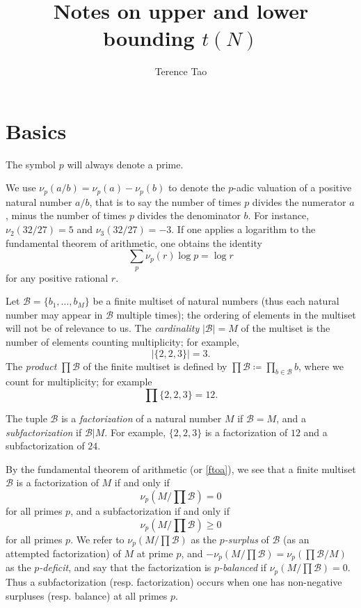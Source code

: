 \documentclass[12pt,a4paper,reqno]{amsart}
\numberwithin{equation}{section}
\theoremstyle{plain}
\theoremstyle{definition}
\newcommand\tuple{{\mathcal B}}
\begin{document}
\title{Notes on upper and lower bounding $t(N)$}

\author{Terence Tao}
\maketitle


\section{Basics}

The symbol $p$ will always denote a prime.

We use $\nu_p(a/b) = \nu_p(a)-\nu_p(b)$ to denote the $p$-adic valuation of a positive natural number $a/b$, that is to say the number of times $p$ divides the numerator $a$, minus the number of times $p$ divides the denominator $b$.  For instance, $\nu_2(32/27)=5$ and $\nu_3(32/27)=-3$. 
If one applies a logarithm to the fundamental theorem of arithmetic, one obtains the identity
\begin{equation}\label{ftoa}
  \sum_p \nu_p(r) \log p = \log r
\end{equation}
for any positive rational $r$.

Let $\tuple = \{ b_1,\dots,b_M\}$ be a finite multiset of natural numbers (thus each natural number may appear in $\tuple$ multiple times); the ordering of elements in the multiset will not be of relevance to us.  The \emph{cardinality} $|\tuple| = M$ of the multiset is the number of elements counting multiplicity; for example,
$$ |\{ 2,2,3\}| = 3.$$
The \emph{product} $\prod \tuple$ of the finite multiset is defined by $\prod \tuple \coloneqq \prod_{b \in \tuple} b$, where we count for multiplicity; for example
$$ \prod \{2,2,3\} = 12.$$

The tuple $\tuple$ is a \emph{factorization} of a natural number $M$ if $\tuple = M$, and a \emph{subfactorization} if $\tuple | M$.  For example, $\{2,2,3\}$ is a factorization of $12$ and a subfactorization of $24$.


By the fundamental theorem of arithmetic (or \eqref{ftoa}), we see that a finite multiset $\tuple$ is a factorization of $M$ if and only if
$$ \nu_p( M / \prod \tuple ) = 0$$
for all primes $p$, and a subfactorization if and only if
$$ \nu_p( M / \prod \tuple ) \geq 0$$
for all primes $p$.  We refer to $\nu_p( M / \prod \tuple )$ as the \emph{$p$-surplus} of $\tuple$ (as an attempted factorization) of $M$ at prime $p$, and $-\nu_p(M/\prod\tuple) = \nu_p(\prod\tuple/M)$ as the \emph{$p$-deficit}, and say that the factorization is \emph{$p$-balanced} if $\nu_p(M/\prod \tuple)=0$.  Thus a subfactorization (resp. factorization) occurs when one has non-negative surpluses (resp. balance) at all primes $p$.
\end{document}
